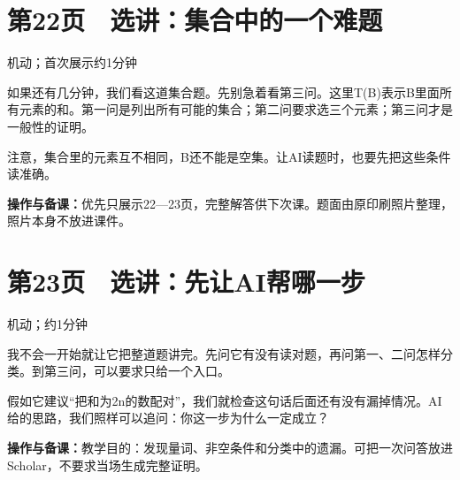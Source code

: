 \documentclass[UTF8,a4paper,11pt,fontset=fandol]{ctexart}
\newcommand{\tip}[1]{\par{\small\color{black!65}\noindent\textbf{操作与备课：}#1\par}}
\begin{document}
\par\vspace{4mm}

\par\noindent\begin{minipage}{\linewidth}

\section*{第22页　选讲：集合中的一个难题}

{\small\noindent 机动；首次展示约1分钟\par}

如果还有几分钟，我们看这道集合题。先别急着看第三问。这里T(B)表示B里面所有元素的和。第一问是列出所有可能的集合；第二问要求选三个元素；第三问才是一般性的证明。

注意，集合里的元素互不相同，B还不能是空集。让AI读题时，也要先把这些条件读准确。

\tip{优先只展示22—23页，完整解答供下次课。题面由原印刷照片整理，照片本身不放进课件。}

\end{minipage}\par\vspace{2mm}

\par\noindent\begin{minipage}{\linewidth}

\section*{第23页　选讲：先让AI帮哪一步}

{\small\noindent 机动；约1分钟\par}

我不会一开始就让它把整道题讲完。先问它有没有读对题，再问第一、二问怎样分类。到第三问，可以要求只给一个入口。

假如它建议“把和为2n的数配对”，我们就检查这句话后面还有没有漏掉情况。AI给的思路，我们照样可以追问：你这一步为什么一定成立？

\tip{教学目的：发现量词、非空条件和分类中的遗漏。可把一次问答放进Scholar，不要求当场生成完整证明。}

\end{minipage}\par\vspace{2mm}
\end{document}
